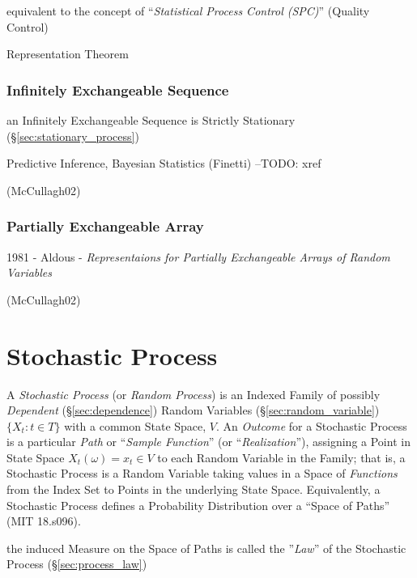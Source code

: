 equivalent to the concept of ``\emph{Statistical Process Control (SPC)}''
(Quality Control)

Representation Theorem



\subsubsection{Infinitely Exchangeable Sequence}
\label{sec:infinitely_exchangeable}

an Infinitely Exchangeable Sequence is Strictly Stationary
(\S\ref{sec:stationary_process})

Predictive Inference, Bayesian Statistics (Finetti) --TODO: xref

(McCullagh02)



\subsubsection{Partially Exchangeable Array}
\label{sec:partially_exchangeable}

1981 - Aldous -
\emph{Representaions for Partially Exchangeable Arrays of Random Variables}

(McCullagh02)



\section{Stochastic Process}\label{sec:stochastic_process}

A \emph{Stochastic Process} (or \emph{Random Process}) is an Indexed Family of
possibly \emph{Dependent} (\S\ref{sec:dependence}) Random Variables
(\S\ref{sec:random_variable}) $\{ X_t : t \in T \}$ with a common State Space,
$V$. An \emph{Outcome} for a Stochastic Process is a particular \emph{Path} or
``\emph{Sample Function}'' (or ``\emph{Realization}''), assigning a Point in
State Space $X_t(\omega) = x_t \in V$ to each Random Variable in the Family;
that is, a Stochastic Process is a Random Variable taking values in a Space of
\emph{Functions} from the Index Set to Points in the underlying State Space.
Equivalently, a Stochastic Process defines a Probability Distribution over a
``Space of Paths'' (MIT 18.s096).

the induced Measure on the Space of Paths is called the ''\emph{Law}'' of the
Stochastic Process (\S\ref{sec:process_law})


